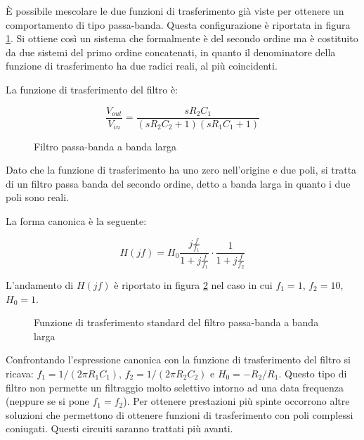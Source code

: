 \documentclass[../main.tex]{subfiles}
\begin{document}
È possibile mescolare le due funzioni di trasferimento già viste per ottenere un comportamento di tipo passa-banda. Questa configurazione è riportata in figura \ref{filtri10}. Si ottiene così un sistema che formalmente è del secondo ordine ma è costituito da due sistemi del primo ordine concatenati, in quanto il denominatore della funzione di trasferimento ha due radici reali, al più coincidenti.

La funzione di trasferimento del filtro è:

\begin{equation}
	\frac{V_{out}}{V_{in}} = \frac{sR_2C_1}{(sR_2C_2 + 1)(sR_1C_1 + 1)}
\end{equation}



\begin{figure}
\begin{center}


\label{filtri10}
\caption{Filtro passa-banda a banda larga}	
\end{center}	
\end{figure}


Dato che la funzione di trasferimento ha uno zero nell’origine e due poli, si tratta di un filtro passa banda del secondo ordine, detto a banda larga in quanto i due poli sono reali.

La forma canonica è la seguente:

\begin{equation}
	H(jf)= H_0 \frac{j \frac{f}{f_1}}{1 + j \frac{f}{f_1}} \cdot \frac{1}{1+ j \frac{f}{f_2}}
\end{equation}

L’andamento di $H(jf)$ è riportato in figura \ref{filtri11} nel caso in cui $f_1 = 1$, $f_2 = 10$, $H_0 = 1$.

\begin{figure}
\begin{center}


\label{filtri11}
\caption{Funzione di trasferimento standard del filtro passa-banda a banda larga}	
\end{center}	
\end{figure}


Confrontando l’espressione canonica con la funzione di trasferimento del filtro si ricava: $f_1 = 1 / (2\pi R_1C_1)$, $f_2 = 1 / (2\pi R_2C_2)$ e $H_0 = -R_2/R_1$. Questo tipo di filtro non permette un filtraggio molto selettivo intorno ad una data frequenza (neppure se si pone $f_1 = f_2$). Per ottenere prestazioni più spinte occorrono altre soluzioni che permettono di ottenere funzioni di trasferimento con poli complessi coniugati. Questi circuiti saranno trattati più avanti.
\end{document}
